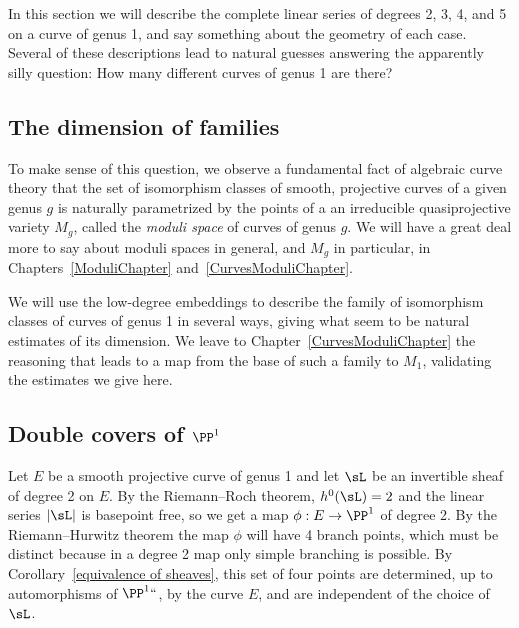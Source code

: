 In this section we will describe the complete linear series of degrees
2, 3, 4, and 5 on a curve of genus 1, and say something
about the geometry of each case. Several of these descriptions lead to natural guesses answering the
apparently silly question: How many different curves of genus 1 are there?

\subsection*{The dimension of families}

To make sense of this question, we observe a fundamental fact of
algebraic curve theory that the set of isomorphism classes of smooth,
projective curves of a given genus $g$ is naturally parametrized by
the points of a
%
%
%
an irreducible
quasiprojective variety
%
$M_g$, called the \emph{moduli space} of curves of genus $g$. We will
have a great deal more to say about moduli spaces in general, and
$M_g$ in particular, in Chapters~\ref{ModuliChapter}
and~\ref{CurvesModuliChapter}.

We will use the low-degree embeddings  to describe the family of
isomorphism classes of curves of genus 1 in several ways, giving
what seem to be natural estimates of its dimension. We leave to Chapter~\ref{CurvesModuliChapter} the reasoning that leads to a map from the base of such a family to $M_{1}$, validating the estimates we give here.

\subsection*{Double covers of $\PP^1$}

Let $E$ be a smooth projective curve of genus 1 and let  $\sL$ be an
%
%
invertible sheaf of degree 2 on $E$. By the Riemann--Roch theorem,
$h^0(\sL) = 2$ and the linear series $|\sL|$ is basepoint free, so we
get a map $\phi : E \to \PP^1$ of degree 2. By the
Riemann--Hurwitz theorem
%
the map $\phi$ will have 4 branch points, which must be
distinct because in a degree 2 map
%
only simple branching is possible. By Corollary~\ref{equivalence of sheaves}, this set of four points are determined, up to automorphisms of $\PP^1` `$, by the curve $E$, and are independent of the choice of~$\sL$.

